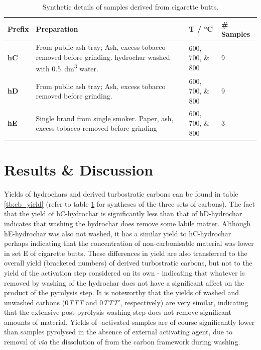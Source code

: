 \begin{table}[t]
    \caption{Synthetic details of samples derived from cigarette butts.}
    \label{tb:cb_synthesis}
    \begin{tabularx}{\textwidth}{lXXl}
        \toprule
            \textbf{Prefix} & \textbf{Preparation} & \textbf{T / \unit{\degreeCelsius}} & \textbf{\# Samples} \\ 
        \midrule
            \textbf{hC}     & From public ash tray; Ash, excess tobacco removed before grinding. \Gls{hydrochar} washed with \qty{0.5}{\dm\cubed} water.              & \numlist[list-final-separator={, }]{600;700;800} & 9              \\
            \textbf{hD}     &  From public ash tray; Ash, excess tobacco removed before grinding.             & \numlist[list-final-separator={, }]{600;700;800} & 9             \\
            \textbf{hE}     & Single brand from single smoker. Paper, ash, excess tobacco removed before grinding              & \numlist[list-final-separator={, }]{600;700;800} & 3              \\
        \bottomrule
    \end{tabularx}%
\end{table}

\section{Results \& Discussion}
\label{s:cb_results}

Yields of \glspl{hydrochar} and derived \glspl{turbostratic carbon} can be found in table \ref{tb:cb_yield} (refer to table \ref{tb:cb_synthesis} for syntheses of the three sets of carbons). The fact that the yield of hC-hydrochar is significantly less than that of hD-hydrochar indicates that washing the \gls{hydrochar} does remove some labile matter. Although hE-hydrochar was also not washed, it has a similar yield to hC-hydrochar perhaps indicating that the concentration of non-carbonisable material was lower in set E of cigarette butts. These differences in yield are also transferred to the overall yield (bracketed numbers) of derived \glspl{turbostratic carbon}, but not to the yield of the activation step considered on its own - indicating that whatever is removed by washing of the \gls{hydrochar} does not have a significant affect on the product of the pyrolysis step. It is noteworthy that the yields of washed and unwashed carbons (0\textit{TTT} and 0\textit{TTT}$'$, respectively) are very similar, indicating that the extensive post-pyrolysis washing step does not remove significant amounts of material. Yields of -activated samples are of course significantly lower than samples pyrolysed in the absence of external \gls{activating agent}, due to removal of  \textit{via} the dissolution of  from the carbon framework during washing.


